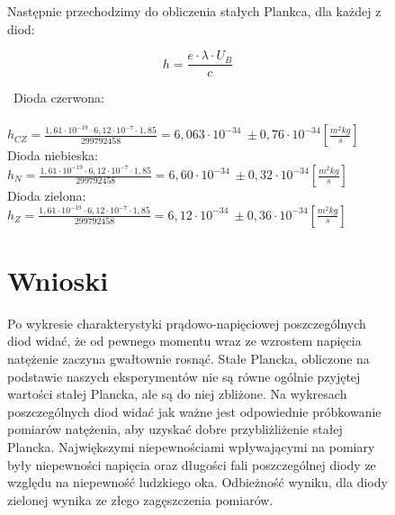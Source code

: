 \documentclass{article}
\begin{document}
\begin{figure}[h!]
    \begin{center}
        Następnie przechodzimy do obliczenia stałych Plankca, dla każdej z diod:
    \end{center}{}
    $$
    h=\frac{e\cdot \lambda \cdot U_{B}}{c}
    $$
    

    \par \ Dioda czerwona:\\ \\
    \vspace{1ex}
    $h_{CZ}=\frac{1,61\cdot 10^{−19}\cdot 6,12\cdot10^{-7} \cdot1,85}{299792458}=6,063\cdot10^{-34} \ \pm0,76\cdot10^{-34} \left[\frac{m^2kg}{s}\right]$\\
    \vspace{2.5ex}
    Dioda niebieska:\\
    \vspace{2ex}
    $h_{N}=\frac{1,61\cdot 10^{−19}\cdot 6,12\cdot10^{-7} \cdot1,85}{299792458}=6,60\cdot10^{-34} \ \pm0,32\cdot10^{-34} \left[\frac{m^2kg}{s}\right]$\\
    \vspace{2ex}
    Dioda zielona:\\
    \vspace{2ex}
    $h_{Z}=\frac{1,61\cdot 10^{−19}\cdot 6,12\cdot10^{-7} \cdot1,85}{299792458}=6,12\cdot10^{-34} \ \pm0,36\cdot10^{-34} \left[\frac{m^2kg}{s}\right]$\\
        
\end{figure}




\begin{figure}[h!]
\section{Wnioski}
Po wykresie charakterystyki prądowo-napięciowej poszczególnych diod widać, że od pewnego momentu wraz ze wzrostem napięcia natężenie zaczyna gwałtownie rosnąć. Stałe Plancka, obliczone na podstawie naszych eksperymentów nie są równe ogólnie pzyjętej wartości stałej Plancka, ale są do niej zbliżone. Na wykresach poszczególnych diod widać jak ważne jest odpowiednie próbkowanie pomiarów natężenia, aby uzyskać dobre przybliżliżenie stałej Plancka. Największymi niepewnościami wpływającymi na pomiary były niepewności napięcia oraz długości fali poszczególnej diody ze względu na niepewność ludzkiego oka. Odbieżność wyniku, dla diody zielonej wynika ze złego zagęszczenia pomiarów.
\end{figure}
\end{document}
